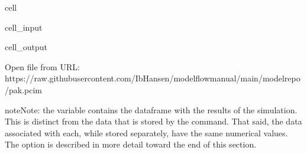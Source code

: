 \documentclass[letterpaper,10pt,english]{jupyterBook}
\begin{document}
\begin{sphinxuseclass}{cell}\begin{sphinxVerbatimInput}

\begin{sphinxuseclass}{cell_input}
\begin{sphinxVerbatim}[commandchars=\\\{\}]
  
                                 
\end{sphinxVerbatim}

\end{sphinxuseclass}\end{sphinxVerbatimInput}
\begin{sphinxVerbatimOutput}

\begin{sphinxuseclass}{cell_output}
\begin{sphinxVerbatim}[commandchars=\\\{\}]
Open file from URL:  https://raw.githubusercontent.com/IbHansen/modelflow\PYGZhy{}manual/main/model\PYGZus{}repo/pak.pcim
\end{sphinxVerbatim}

\end{sphinxuseclass}\end{sphinxVerbatimOutput}

\end{sphinxuseclass}
\begin{sphinxadmonition}{note}{Note:}
\sphinxAtStartPar
the variable  contains the dataframe with the results of the simulation.  This is distinct from the data that is stored by the  command. That said, the data associated with each, while stored separately, have the same numerical values. The  option is described in more detail toward the end of this section.
\end{sphinxadmonition}
\end{document}
